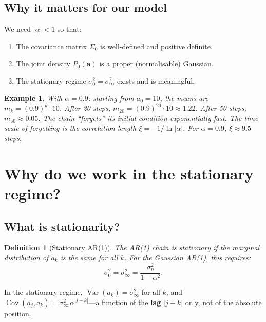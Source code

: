 \documentclass[11pt,a4paper]{article}
\newtheorem{definition}[theorem]{Definition}
\newtheorem{example}[theorem]{Example}
\newcommand{\Var}{\operatorname{Var}}
\newcommand{\Cov}{\operatorname{Cov}}
\newcommand{\sigeta}{\sigma_\eta^2}
\newcommand{\sigzero}{\sigma_0^2}
\newcommand{\siginf}{\sigma_\infty^2}
\begin{document}
\subsection{Why it matters for our model}

We need $|\alpha| < 1$ so that:
\begin{enumerate}[nosep]
  \item The covariance matrix $\Sigma_0$ is well-defined and positive definite.
  \item The joint density $P_0(\mathbf{a})$ is a proper (normalisable) Gaussian.
  \item The stationary regime $\sigzero = \siginf$ exists and is meaningful.
\end{enumerate}

\begin{example}
With $\alpha = 0.9$: starting from $a_0 = 10$, the means are $m_k = (0.9)^k \cdot 10$. After 20 steps, $m_{20} = (0.9)^{20} \cdot 10 \approx 1.22$.  After 50 steps, $m_{50} \approx 0.05$.  The chain ``forgets'' its initial condition exponentially fast.  The time scale of forgetting is the \emph{correlation length} $\xi = -1/\ln|\alpha|$.  For $\alpha = 0.9$, $\xi \approx 9.5$ steps.
\end{example}


\section{Why do we work in the stationary regime?}
\label{sec:q2}

\subsection{What is stationarity?}

\begin{definition}[Stationary AR(1)]
The AR(1) chain is \emph{stationary} if the marginal distribution of $a_k$ is the same for all $k$.  For the Gaussian AR(1), this requires:
\begin{equation}
  \sigzero = \siginf = \frac{\sigeta}{1-\alpha^2}.
\end{equation}
\end{definition}

In the stationary regime, $\Var(a_k) = \siginf$ for all $k$, and $\Cov(a_j, a_k) = \siginf\,\alpha^{|j-k|}$---a function of the \textbf{lag} $|j-k|$ only, not of the absolute position.
\end{document}
